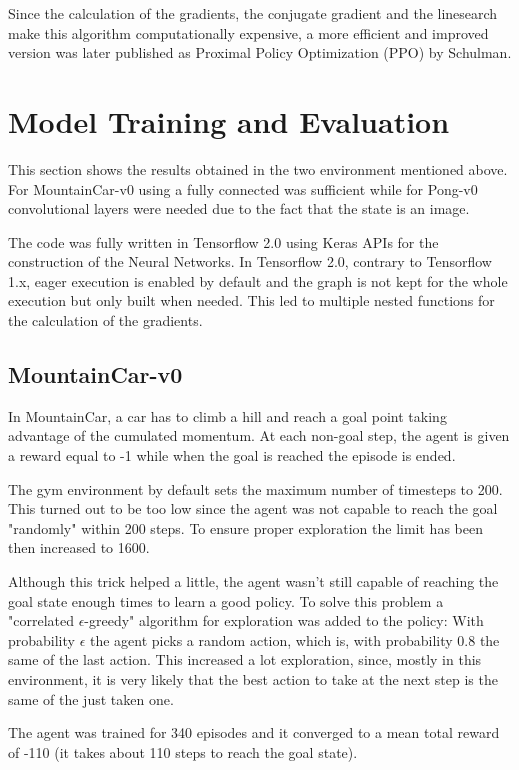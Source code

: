 \documentclass[12pt,a4paper]{article}
\begin{document}
Since the calculation of the gradients, the conjugate gradient and the linesearch make this algorithm computationally expensive, a more efficient and improved version was later published as Proximal Policy Optimization (PPO) by Schulman.

\section{Model Training and Evaluation}
 
This section shows the results obtained in the two environment mentioned above. For MountainCar-v0 using a fully connected was sufficient while for Pong-v0 convolutional layers were needed due to the fact that the state is an image.

The code was fully written in Tensorflow 2.0 using Keras APIs for the construction of the Neural Networks. In Tensorflow 2.0, contrary to Tensorflow 1.x, eager execution is enabled by default and the graph is not kept for the whole execution but only built when needed. This led to multiple nested functions for the calculation of the gradients.

\subsection{MountainCar-v0}

In MountainCar, a car has to climb a hill and reach a goal point taking advantage of the cumulated momentum. At each non-goal step, the agent is given a reward equal to -1 while when the goal is reached the episode is ended.

The gym environment by default sets the maximum number of timesteps to 200. This turned out to be too low since the agent was not capable to reach the goal "randomly" within 200 steps. To ensure proper exploration the limit has been then increased to 1600.

Although this trick helped a little, the agent wasn't still capable of reaching the goal state enough times to learn a good policy. To solve this problem a "correlated $\epsilon$-greedy" algorithm for exploration was added to the policy: With probability $\epsilon$ the agent picks a random action, which is, with probability 0.8 the same of the last action. This increased a lot exploration, since, mostly in this environment, it is very likely that the best action to take at the next step is the same of the just taken one.

The agent was trained for 340 episodes and it converged to a mean total reward of -110 (it takes about 110 steps to reach the goal state). 
\end{document}
